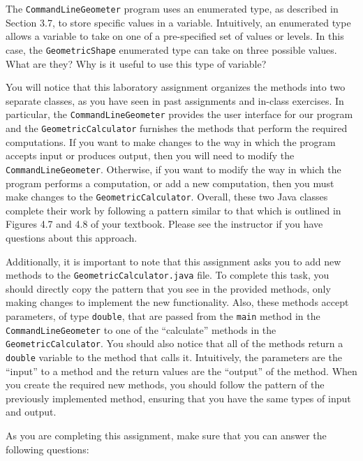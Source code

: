 \documentclass[11pt]{article}
\begin{document}
The {\tt CommandLineGeometer} program uses an enumerated type, as described in
Section 3.7, to store specific values in a variable. Intuitively, an enumerated
type allows a variable to take on one of a pre-specified set of values or
levels. In this case, the {\tt GeometricShape} enumerated type can take on three
possible values. What are they? Why is it useful to use this type of variable?

You will notice that this laboratory assignment organizes the methods into two
separate classes, as you have seen in past assignments and in-class exercises.
In particular, the {\tt CommandLineGeometer} provides the user interface for our
program and the {\tt GeometricCalculator} furnishes the methods that perform the
required computations.  If you want to make changes to the way in which the
program accepts input or produces output, then you will need to modify the {\tt
CommandLineGeometer}. Otherwise, if you want to modify the way in which the
program performs a computation, or add a new computation, then you must make
changes to the {\tt GeometricCalculator}. Overall, these two Java classes
complete their work by following a pattern similar to that which is outlined in
Figures 4.7 and 4.8 of your textbook. Please see the instructor if you have
questions about this approach.

Additionally, it is important to note that this assignment asks you to add new
methods to the {\tt GeometricCalculator.java} file. To complete this task, you
should directly copy the pattern that you see in the provided methods, only
making changes to implement the new functionality. Also, these methods accept
parameters, of type {\tt double}, that are passed from the {\tt main} method in
the {\tt CommandLineGeometer} to one of the ``calculate'' methods in the {\tt
GeometricCalculator}. You should also notice that all of the methods return a
{\tt double} variable to the method that calls it. Intuitively, the parameters
are the ``input'' to a method and the return values are the ``output'' of the
method. When you create the required new methods, you should follow the pattern
of the previously implemented method, ensuring that you have the same types of
input and output.

As you are completing this assignment, make sure that you can answer the
following questions:
\end{document}
